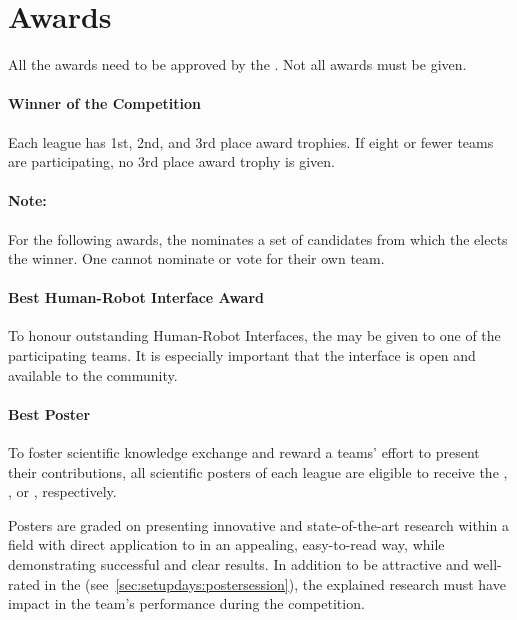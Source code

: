 \section{Awards}
\label{sec:introduction:awards}
All the awards need to be approved by the \RCF{}. Not all awards must be given.


\paragraph{Winner of the Competition}
\label{sec:introduction:winner}
Each league has 1st, 2nd, and 3rd place award trophies. If eight or fewer teams are participating, no 3rd place award trophy is given.

\newpage
\paragraph*{Note: } For the following awards, the \EC{} nominates a set of candidates from which the \TC{} elects the winner. One cannot nominate or vote for their own team.

\paragraph{Best Human-Robot Interface Award}
\label{sec:introduction:hriaward}
To honour outstanding Human-Robot Interfaces, the \HRIAward{} may be given to one of the participating teams. It is especially important that the interface is open and available to the \AtHome{} community.

\paragraph{Best Poster}
\label{sec:introduction:bestposter}
To foster scientific knowledge exchange and reward a teams' effort to present their contributions, all scientific posters of each league are eligible to receive the \DSPLPosterAward, \SSPLPosterAward, or \OPLPosterAward, respectively.

Posters are graded on presenting innovative and state-of-the-art research within a field with direct application to \RoboCup\AtHome{} in an appealing, easy-to-read way, while demonstrating successful and clear results. In addition to be attractive and well-rated in the \PS{} (see~\ref{sec:setupdays:postersession}), the explained research must have impact in the team's performance during the competition.

